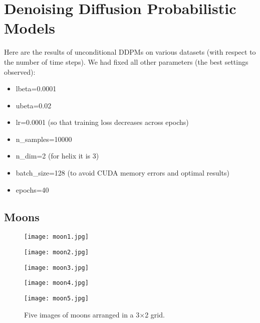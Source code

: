 \documentclass[a4paper,12pt]{article}
\title{\cooltitle{CS726 Programming Assignment -- 2 Report}}
\author{
\textbf{Saksham Rathi (22B1003)}\\
\textbf{Sharvanee Sonawane (22B0943)}\\
\textbf{Deeksha Dhiwakar (22B0988)}\\
\small Department of Computer Science, \\
Indian Institute of Technology Bombay \\}
\date{}
\begin{document}
\maketitle

\section*{Denoising Diffusion Probabilistic Models}

Here are the results of unconditional DDPMs on various datasets (with respect to the number of time steps). We had fixed all other parameters (the best settings observed):

\begin{itemize}
  \item lbeta=0.0001
  \item ubeta=0.02
  \item lr=0.0001 (so that training loss decreases across epochs)
  \item n\_samples=10000
  \item n\_dim=2 (for helix it is 3)
  \item batch\_size=128 (to avoid CUDA memory errors and optimal results)
  \item epochs=40
\end{itemize}

\subsection*{Moons}

\begin{figure}[h]
  \centering
  \begin{minipage}{0.3\textwidth}
      \centering
      \texttt{[image: moon1.jpg]}
  \end{minipage}
  \begin{minipage}{0.3\textwidth}
      \centering
      \texttt{[image: moon2.jpg]}
  \end{minipage}
  \begin{minipage}{0.3\textwidth}
      \centering
      \texttt{[image: moon3.jpg]}
  \end{minipage}

  \vspace{0.5cm}  %

  \begin{minipage}{0.3\textwidth}
      \centering
      \texttt{[image: moon4.jpg]}
  \end{minipage}
  \begin{minipage}{0.3\textwidth}
      \centering
      \texttt{[image: moon5.jpg]}
  \end{minipage}
  \begin{minipage}{0.3\textwidth}
      \centering
  \end{minipage}

  \caption{Five images of moons arranged in a 3×2 grid.}
\end{figure}
\end{document}
